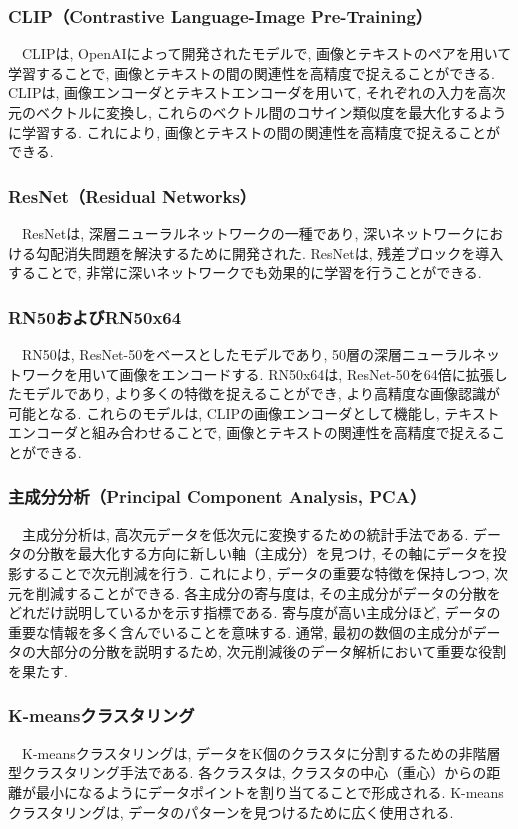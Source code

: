 \documentclass[a4paper, 12pt]{report}
\begin{document}
\subsubsection{CLIP（Contrastive Language-Image Pre-Training）}
　CLIPは, OpenAIによって開発されたモデルで, 画像とテキストのペアを用いて学習することで, 画像とテキストの間の関連性を高精度で捉えることができる. CLIPは, 画像エンコーダとテキストエンコーダを用いて, それぞれの入力を高次元のベクトルに変換し, これらのベクトル間のコサイン類似度を最大化するように学習する. これにより, 画像とテキストの間の関連性を高精度で捉えることができる. 

\subsubsection{ResNet（Residual Networks）}
　ResNetは, 深層ニューラルネットワークの一種であり, 深いネットワークにおける勾配消失問題を解決するために開発された. ResNetは, 残差ブロックを導入することで, 非常に深いネットワークでも効果的に学習を行うことができる. 

\subsubsection{RN50およびRN50x64}
　RN50は, ResNet-50をベースとしたモデルであり, 50層の深層ニューラルネットワークを用いて画像をエンコードする. RN50x64は, ResNet-50を64倍に拡張したモデルであり, より多くの特徴を捉えることができ, より高精度な画像認識が可能となる. これらのモデルは, CLIPの画像エンコーダとして機能し, テキストエンコーダと組み合わせることで, 画像とテキストの関連性を高精度で捉えることができる. 

\subsubsection{主成分分析（Principal Component Analysis, PCA）}
　主成分分析は, 高次元データを低次元に変換するための統計手法である. データの分散を最大化する方向に新しい軸（主成分）を見つけ, その軸にデータを投影することで次元削減を行う. これにより, データの重要な特徴を保持しつつ, 次元を削減することができる. 
各主成分の寄与度は, その主成分がデータの分散をどれだけ説明しているかを示す指標である. 寄与度が高い主成分ほど, データの重要な情報を多く含んでいることを意味する. 通常, 最初の数個の主成分がデータの大部分の分散を説明するため, 次元削減後のデータ解析において重要な役割を果たす. 

\subsubsection{K-meansクラスタリング}
　K-meansクラスタリングは, データをK個のクラスタに分割するための非階層型クラスタリング手法である. 各クラスタは, クラスタの中心（重心）からの距離が最小になるようにデータポイントを割り当てることで形成される. K-meansクラスタリングは, データのパターンを見つけるために広く使用される. 
\end{document}
